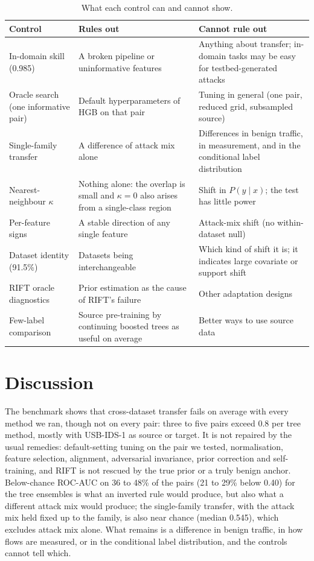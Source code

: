 \documentclass[11pt]{article}
\begin{document}
\begin{table}[t]
\centering\small
\caption{What each control can and cannot show.}\label{tab:controls}
\begin{tabular}{p{}p{}p{}}
\toprule
Control & Rules out & Cannot rule out \\
\midrule
In-domain skill (0.985) & A broken pipeline or uninformative features & Anything about transfer; in-domain tasks may be easy for testbed-generated attacks \\
Oracle search (one informative pair) & Default hyperparameters of HGB on that pair & Tuning in general (one pair, reduced grid, subsampled source) \\
Single-family transfer & A difference of attack mix alone & Differences in benign traffic, in measurement, and in the conditional label distribution \\
Nearest-neighbour $\kappa$ & Nothing alone: the overlap is small and $\kappa=0$ also arises from a single-class region & Shift in $P(y\mid x)$; the test has little power \\
Per-feature signs & A stable direction of any single feature & Attack-mix shift (no within-dataset null) \\
Dataset identity (91.5\%) & Datasets being interchangeable & Which kind of shift it is; it indicates large covariate or support shift \\
RIFT oracle diagnostics & Prior estimation as the cause of RIFT's failure & Other adaptation designs \\
Few-label comparison & Source pre-training by continuing boosted trees as useful on average & Better ways to use source data \\
\bottomrule
\end{tabular}
\end{table}

\section{Discussion}
The benchmark shows that cross-dataset transfer fails on average with every method we ran, though not on every pair: three to five pairs exceed 0.8 per tree method, mostly with USB-IDS-1 as source or target.
It is not repaired by the usual remedies: default-setting tuning on the pair we tested, normalisation, feature selection, alignment, adversarial invariance, prior correction and self-training, and RIFT is not rescued by the true prior or a truly benign anchor.
Below-chance ROC-AUC on 36 to 48\% of the pairs (21 to 29\% below 0.40) for the tree ensembles is what an inverted rule would produce, but also what a different attack mix would produce; the single-family transfer, with the attack mix held fixed up to the family, is also near chance (median 0.545), which excludes attack mix alone.
What remains is a difference in benign traffic, in how flows are measured, or in the conditional label distribution, and the controls cannot tell which.
\end{document}

